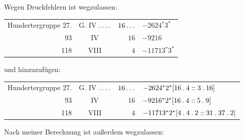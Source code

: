 \par{}Wegen Druckfehlern ist wegzulassen:
\begin{longtable}{rcrl}
Hundertergruppe 27. & G. IV $\mathinner{.\,.\,.\,.}$ & $16\mathinner{.\,.\,.}$ & $-2624{}^{*}3^{*}$ \\
93 & IV & $16$ & $-9216$ \\
118 & VIII & $4$ & $-11713{}^{*}3^{*}$ \\
\end{longtable}
\par{}und hinzuzufügen:
\begin{longtable}{rcrl}
Hundertergruppe 27. & G. IV $\mathinner{.\,.\,.\,.}$ & $16\mathinner{.\,.\,.}$ & $-2624{}^{*}2^{*}[16\mathbin{.}4::3\mathbin{.}16]$ \\
93 & IV & $16$ & $-9216{}^{*}2^{*}[16\mathbin{.}4::5\mathbin{.}9]$ \\
118 & VIII & $4$ & $-11713{}^{*}2^{*}[4\mathbin{.}4\mathbin{.}2::31\mathbin{.}37\mathbin{.}2]$ \\
\end{longtable}
\par{}Nach meiner Berechnung ist außerdem wegzulassen:

